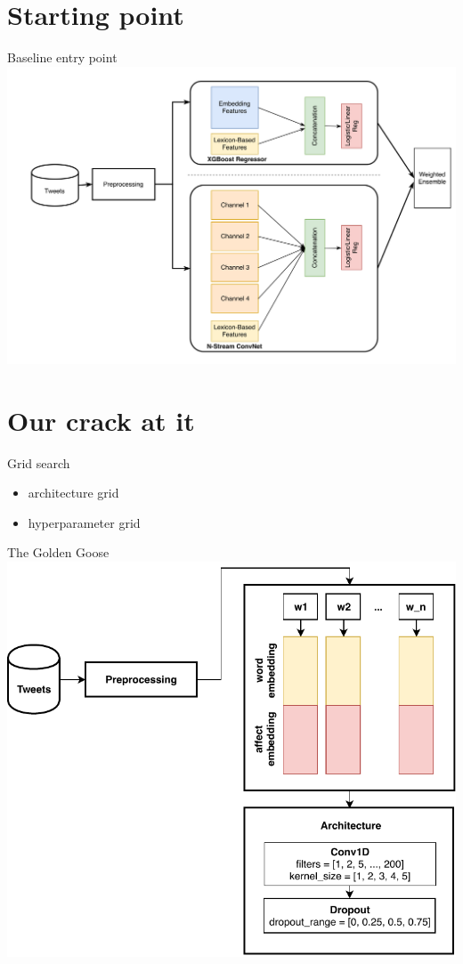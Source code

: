 \documentclass[10pt, utf8]{beamer}
\begin{document}
\section{Starting point}
\begin{frame}{Baseline entry point}
    \includegraphics[width=\textwidth]{architecture.png}
\end{frame}

\section{Our crack at it}
\begin{frame}{Grid search}
    \begin{itemize}
        \item architecture grid
        \item hyperparameter grid
    \end{itemize}
\end{frame}

\begin{frame}{The Golden Goose}
    \includegraphics[height=\textheight]{architecture.pdf}
\end{frame}
\end{document}
